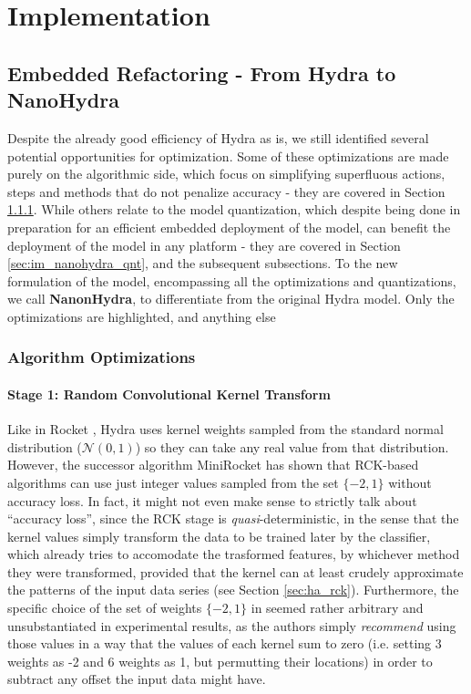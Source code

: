 \chapter{Implementation}
\label{ch:implementation}

\section{Embedded Refactoring - From Hydra to NanoHydra}\label{sec:im_nanohydra}

    Despite the already good efficiency of Hydra as is, we still identified several potential opportunities for optimization. Some of these optimizations are
    made purely on the algorithmic side, which focus on simplifying superfluous actions, steps and methods that do not penalize accuracy - they are covered in Section \ref{sec:im_nanohydra_algopt}.
    While others relate to the model quantization, which despite being done in preparation for an efficient embedded deployment of the model, can benefit the deployment of the model in any platform - they are covered in Section \ref{sec:im_nanohydra_qnt}, and the subsequent subsections.
    To the new formulation of the model, encompassing all the optimizations and quantizations, we call \textbf{NanonHydra}, to differentiate from the original Hydra model. Only the optimizations are highlighted, and anything else

    \subsection{Algorithm Optimizations}\label{sec:im_nanohydra_algopt}

        \subsubsection{Stage 1: Random Convolutional Kernel Transform}\label{sec:im_nanohydra_algopt_s1}
        
        Like in Rocket \cite{Dempster2020}, Hydra uses kernel weights sampled from the standard normal distribution ($\mathcal{N}(0,1)$) so they can take any real value from that distribution.
        However, the successor algorithm MiniRocket \cite{Dempster2021MR} has shown that RCK-based algorithms can use just integer values sampled from the  set $\{-2,1\}$ without accuracy loss. 
        In fact, it might not even make sense to strictly talk about ``accuracy loss'', since the RCK stage is \emph{quasi}-deterministic, in the sense that the kernel values simply transform the data to be trained later by the classifier,
        which already tries to accomodate the trasformed features, by whichever method they were transformed, provided that the kernel can at least crudely approximate the patterns of the input data series (see Section \ref{sec:ha_rck}).
        Furthermore, the specific choice of the set of weights $\{-2,1\}$ in \cite{Dempster2021MR} seemed rather arbitrary and unsubstantiated in experimental results, as the authors simply \emph{recommend} using those values in a way that 
        the values of each kernel sum to zero (i.e. setting 3 weights as -2 and 6 weights as 1, but permutting their locations) in order to subtract any offset the input data might have.

